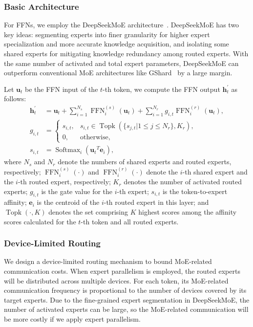 \documentclass[11pt, a4paper, logo, copyright, nonumbering]{deepseek}
\newcommand{\dsmoe}{DeepSeekMoE}
\begin{document}
\begin{CJK*}{UTF8}{gbsn}
\subsubsection{Basic Architecture}

For FFNs, we employ the \dsmoe{} architecture~\citep{deepseekmoe}. 
\dsmoe{} has two key ideas: segmenting experts into finer granularity for higher expert specialization and more accurate knowledge acquisition, and isolating some shared experts for mitigating knowledge redundancy among routed experts. 
With the same number of activated and total expert parameters, \dsmoe{} can outperform conventional MoE architectures like GShard~\citep{gshard} by a large margin. 

Let $\mathbf{u}_{t}$ be the FFN input of the $t$-th token, we compute the FFN output $\mathbf{h}_{t}^{\prime}$ as follows:
\begin{align}
    \mathbf{h}_{t}^{\prime} & = \mathbf{u}_{t} + \sum_{i=1}^{N_{s}} {\operatorname{FFN}^{(s)}_{i}\left( \mathbf{u}_{t} \right)} + \sum_{i=1}^{N_r} {g_{i,t} \operatorname{FFN}^{(r)}_{i}\left( \mathbf{u}_{t} \right)}, \\
    g_{i,t} & = \begin{cases} 
    s_{i,t}, & s_{i,t} \in \operatorname{Topk} (\{ s_{j, t} | 1 \leq j \leq N_r \}, K_{r}), \\
    0, & \text{otherwise}, 
    \end{cases} \\
    s_{i,t} & = \operatorname{Softmax}_i \left( {\mathbf{u}_{t}}^{T} \mathbf{e}_{i} \right),
\end{align}
where $N_{s}$ and $N_r$ denote the numbers of shared experts and routed experts, respectively; 
$\operatorname{FFN}^{(s)}_{i}(\cdot)$ and $\operatorname{FFN}^{(r)}_{i}(\cdot)$ denote the $i$-th shared expert and the $i$-th routed expert, respectively; 
$K_{r}$ denotes the number of activated routed experts; 
$g_{i,t}$ is the gate value for the $i$-th expert; 
$s_{i,t}$ is the token-to-expert affinity; 
$\mathbf{e}_{i}$ is the centroid of the $i$-th routed expert in this layer; 
and $\operatorname{Topk}(\cdot, K)$ denotes the set comprising $K$ highest scores among the affinity scores calculated for the $t$-th token and all routed experts.

\subsubsection{Device-Limited Routing}

We design a device-limited routing mechanism to bound MoE-related communication costs. 
When expert parallelism is employed, the routed experts will be distributed across multiple devices. 
For each token, its MoE-related communication frequency is proportional to the number of devices covered by its target experts.
Due to the fine-grained expert segmentation in \dsmoe{}, the number of activated experts can be large, so the MoE-related communication will be more costly if we apply expert parallelism. 


\end{CJK*}
\end{document}
